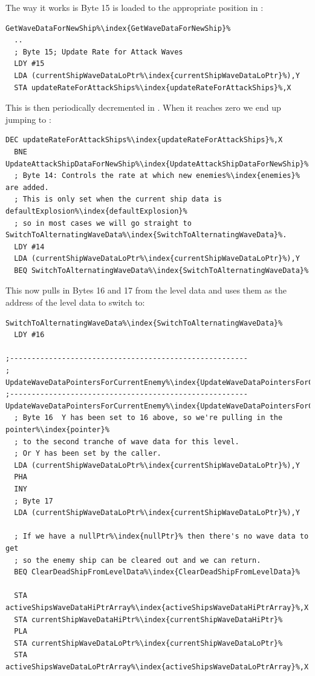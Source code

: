 The way it works is Byte 15 is loaded to the appropriate position in :

\begin{lstlisting}[escapechar=\%]
GetWaveDataForNewShip%\index{GetWaveDataForNewShip}%
  ..
  ; Byte 15; Update Rate for Attack Waves
  LDY #15
  LDA (currentShipWaveDataLoPtr%\index{currentShipWaveDataLoPtr}%),Y
  STA updateRateForAttackShips%\index{updateRateForAttackShips}%,X
\end{lstlisting}

This is then periodically decremented in . When it reaches zero we 
end up jumping to :
\begin{lstlisting}[escapechar=\%]
  DEC updateRateForAttackShips%\index{updateRateForAttackShips}%,X
  BNE UpdateAttackShipDataForNewShip%\index{UpdateAttackShipDataForNewShip}%
  ; Byte 14: Controls the rate at which new enemies%\index{enemies}% are added.
  ; This is only set when the current ship data is defaultExplosion%\index{defaultExplosion}%
  ; so in most cases we will go straight to SwitchToAlternatingWaveData%\index{SwitchToAlternatingWaveData}%.
  LDY #14
  LDA (currentShipWaveDataLoPtr%\index{currentShipWaveDataLoPtr}%),Y
  BEQ SwitchToAlternatingWaveData%\index{SwitchToAlternatingWaveData}%
\end{lstlisting}

This now pulls in Bytes 16 and 17 from the level data and uses them as the address of the level data to 
switch to:
\begin{lstlisting}[escapechar=\%]
SwitchToAlternatingWaveData%\index{SwitchToAlternatingWaveData}%   
  LDY #16

;-------------------------------------------------------
; UpdateWaveDataPointersForCurrentEnemy%\index{UpdateWaveDataPointersForCurrentEnemy}%
;-------------------------------------------------------
UpdateWaveDataPointersForCurrentEnemy%\index{UpdateWaveDataPointersForCurrentEnemy}%
  ; Byte 16  Y has been set to 16 above, so we're pulling in the pointer%\index{pointer}%
  ; to the second tranche of wave data for this level. 
  ; Or Y has been set by the caller.
  LDA (currentShipWaveDataLoPtr%\index{currentShipWaveDataLoPtr}%),Y
  PHA
  INY
  ; Byte 17
  LDA (currentShipWaveDataLoPtr%\index{currentShipWaveDataLoPtr}%),Y

  ; If we have a nullPtr%\index{nullPtr}% then there's no wave data to get
  ; so the enemy ship can be cleared out and we can return.
  BEQ ClearDeadShipFromLevelData%\index{ClearDeadShipFromLevelData}%

  STA activeShipsWaveDataHiPtrArray%\index{activeShipsWaveDataHiPtrArray}%,X
  STA currentShipWaveDataHiPtr%\index{currentShipWaveDataHiPtr}%
  PLA
  STA currentShipWaveDataLoPtr%\index{currentShipWaveDataLoPtr}%
  STA activeShipsWaveDataLoPtrArray%\index{activeShipsWaveDataLoPtrArray}%,X
\end{lstlisting}


